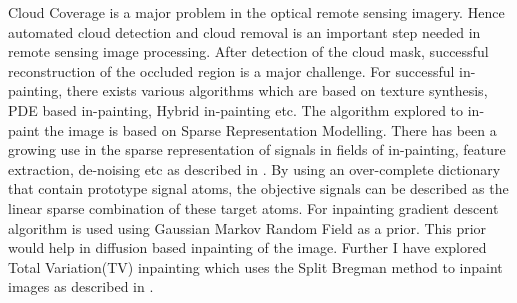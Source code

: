 \documentclass[a4paper, 15pt]{article}
\begin{document}
	Cloud Coverage is a major problem in the optical remote sensing imagery. Hence automated cloud detection and cloud removal is an important step needed in remote sensing image processing. After detection of the cloud mask, successful reconstruction of the occluded region is a major challenge. For successful in-painting, there exists various algorithms which are based on texture synthesis, PDE based in-painting, Hybrid in-painting etc. The algorithm explored to in-paint the image is based on Sparse Representation Modelling\cite{1}. There has been a growing use in the sparse representation of signals in fields of in-painting, feature extraction, de-noising etc as described in \cite{2}. By using an over-complete dictionary that contain prototype signal atoms, the objective signals can be described as the linear sparse combination of these target atoms. For inpainting gradient descent algorithm is used using Gaussian Markov Random Field as a prior. This prior would help in diffusion based inpainting of the image. Further I have explored Total Variation(TV) inpainting which uses the Split Bregman method to inpaint images as described in \cite{5}.
	\par
\end{document}
